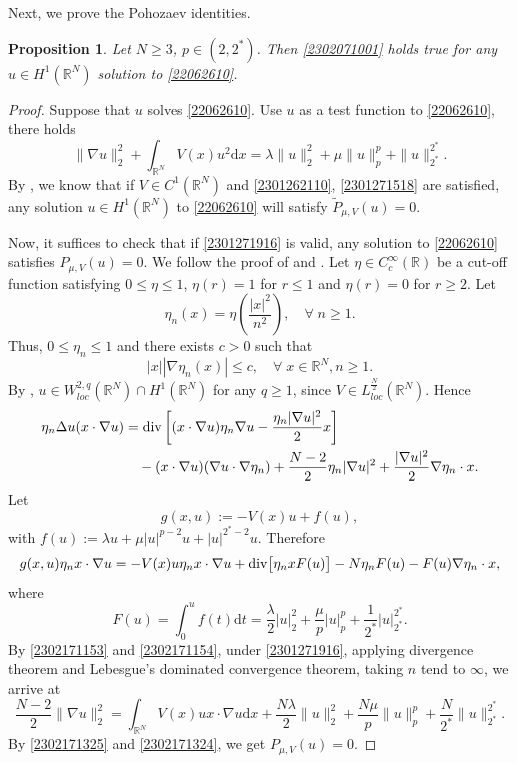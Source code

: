\documentclass[10pt]{article}
\numberwithin{equation}{section}
\newtheorem{proposition}[theorem]{Proposition}
\newcommand{\ud}{\mathrm{d}}
\numberwithin{equation}{section}
\begin{document}
Next, we prove the Pohozaev identities.
\begin{proposition}\label{2302171335}
Let $N\ge 3$, $p\in (2, 2^*)$. Then \eqref{2302071001} holds true for any $u \in H^1({\mathbb R}^N)$ solution to \eqref{22062610}.
\end{proposition}
\begin{proof}
Suppose that $u$ solves \eqref{22062610}. Use $u$ as a test function to \eqref{22062610}, there holds
\begin{equation}\label{2302171325}
\|\nabla u\|_2^2+\int_{\mathbb{R}^N}V(x)u^2 \ud x=\lambda \|u\|_2^2+\mu \|u\|_p^p+\|u\|_{2^*}^{2^*}.
\end{equation}
By \cite[Proposition 2.1]{LM2014}, we know that if $V\in C^1(\mathbb{R}^N)$ and \eqref{2301262110}, \eqref{2301271518} are satisfied, any solution $u \in H^1({\mathbb R}^N)$ to \eqref{22062610} will satisfy $\widetilde{P}_{\mu, V}(u)=0$. 

Now, it suffices to check that if \eqref{2301271916} is valid, any solution to \eqref{22062610} satisfies $P_{\mu, V}(u)=0$. We follow the proof of \cite[Proposition 2.1]{LM2014} and \cite[Theorem B.3]{Willem96}. Let $\eta\in C_c^{\infty}(\mathbb{R})$ be a cut-off function satisfying $0\le \eta \le 1$, $\eta(r)=1$ for $r\le 1$ and $\eta(r)=0$ for $r\ge 2$. Let
\[
\eta_n(x)=\eta\left(\frac{|x|^2}{n^2}\right), \quad \forall\; n \ge 1.
\]
Thus, $0 \le \eta_n\le 1$ and there exists $c>0$ such that
\[
|x||\nabla \eta_n(x)|\le c, \quad \forall \; x \in {\mathbb R}^N, n \ge 1.
\]
By \cite[B.3 Lemma]{Struwe2008}, $u\in W_{loc}^{2, q}(\mathbb{R}^N)\cap H^1(\mathbb{R}^N)$ for any $q\ge 1$, since $V\in L_{loc}^{\frac{N}{2}}(\mathbb{R}^N)$. Hence
\begin{equation}\label{2302171153}
\begin{aligned}
\eta_n\Delta u(x\cdot \nabla u) & = {\rm div}\left[(x\cdot \nabla u)\eta_n\nabla u - \frac{\eta_n|\nabla u|^2}{2}x\right]\\
&\quad - (x\cdot \nabla u)(\nabla u\cdot\nabla \eta_n) + \frac{N-2}{2}\eta_n|\nabla u|^2+ \frac{|\nabla u|^2}{2}\nabla \eta_n \cdot x.
\end{aligned}
\end{equation}
Let
\[
g(x, u):=-V(x)u+f(u),
\]
with $f(u):=\lambda u+\mu |u|^{p-2}u+|u|^{2^{*}-2}u$. Therefore
\begin{equation}\label{2302171154}
g(x, u)\eta_nx\cdot \nabla u = -V(x)u\eta_nx\cdot \nabla u+ {\rm div}\big[\eta_n xF(u)\big] -N\eta_nF(u)- F(u)\nabla \eta_n\cdot x,
\end{equation}
where
\[
F(u)=\int_0^uf(t) \ud t=\frac{\lambda}{2}|u|_2^2+\frac{\mu}{p} |u|_p^p+\frac{1}{2^*}|u|_{2^*}^{2^*}.
\]
By \eqref{2302171153} and \eqref{2302171154}, under \eqref{2301271916}, applying divergence theorem and Lebesgue's dominated convergence theorem, taking $n$ tend to $\infty$, we arrive at
\begin{equation}\label{2302171324}
\frac{N-2}{2}\|\nabla u\|_2^2=\int_{\mathbb{R}^N}V(x)ux\cdot \nabla u \ud x+\frac{N\lambda}{2}\|u\|_2^2+\frac{N\mu}{p} \|u\|_p^p+\frac{N}{2^*}\|u\|_{2^*}^{2^*}.
\end{equation}
By \eqref{2302171325} and \eqref{2302171324}, we get $P_{\mu, V}(u)=0$.
\end{proof}
\end{document}
